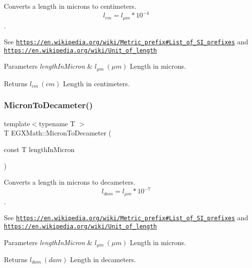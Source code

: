 Converts a length in microns to centimeters. \[ l_{cm}=l_{\mu m} * 10^{-4} \]. 

See \href{https://en.wikipedia.org/wiki/Metric_prefix#List_of_SI_prefixes}{\tt https\+://en.\+wikipedia.\+org/wiki/\+Metric\+\_\+prefix\#\+List\+\_\+of\+\_\+\+S\+I\+\_\+prefixes} and \href{https://en.wikipedia.org/wiki/Unit_of_length}{\tt https\+://en.\+wikipedia.\+org/wiki/\+Unit\+\_\+of\+\_\+length} 
\begin{DoxyParams}{Parameters}
{\em length\+In\+Micron} & $ l_{\mu m}\ (\mu m)$ Length in microns. \\
\hline
\end{DoxyParams}
\begin{DoxyReturn}{Returns}
$ l_{cm}\ (cm)$ Length in centimeters. 
\end{DoxyReturn}
\mbox{\label{group___e_g_x_math-_conversions-_length_conversions-_non-_s_i-_micron-_s_i_gab41e5d3a8f679f0e476fbd7bf2c6dcc7}} 
\subsubsection{\texorpdfstring{Micron\+To\+Decameter()}{MicronToDecameter()}}
{\footnotesize\ttfamily template$<$typename T $>$ \\
T E\+G\+X\+Math\+::\+Micron\+To\+Decameter (\begin{DoxyParamCaption}\item[{const T}]{length\+In\+Micron }\end{DoxyParamCaption})}



Converts a length in microns to decameters. \[ l_{dam}=l_{\mu m} * 10^{-7} \]. 

See \href{https://en.wikipedia.org/wiki/Metric_prefix#List_of_SI_prefixes}{\tt https\+://en.\+wikipedia.\+org/wiki/\+Metric\+\_\+prefix\#\+List\+\_\+of\+\_\+\+S\+I\+\_\+prefixes} and \href{https://en.wikipedia.org/wiki/Unit_of_length}{\tt https\+://en.\+wikipedia.\+org/wiki/\+Unit\+\_\+of\+\_\+length} 
\begin{DoxyParams}{Parameters}
{\em length\+In\+Micron} & $ l_{\mu m}\ (\mu m)$ Length in microns. \\
\hline
\end{DoxyParams}
\begin{DoxyReturn}{Returns}
$ l_{dam}\ (dam)$ Length in decameters. 
\end{DoxyReturn}
\mbox{\label{group___e_g_x_math-_conversions-_length_conversions-_non-_s_i-_micron-_s_i_gaac80fa1efc245cc204395a3a2771c2be}} 
